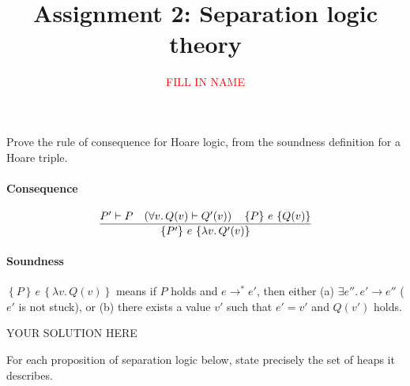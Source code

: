 \documentclass[11pt,twoside]{exam}
\title{Assignment 2: Separation logic theory}
\author{\textcolor{red}{FILL IN NAME}}
\def\fun#1{\lambda #1.\,}
\def\hoare#1#2#3{\left\{#1\right\} \, #2 \, \left\{#3\right\}}
\def\entails{\vdash}
\def\pointsto{\mapsto}
\begin{document}
\maketitle

\begin{questions}

\question[5]
Prove the rule of consequence for Hoare logic, from the soundness definition for
a Hoare triple.

\paragraph{Consequence}
\[
  \frac{P' \entails P \quad (\forall v.\, Q(v) \entails Q'(v)) \quad \hoare{P}{e}{Q(v)}}{%
  \hoare{P'}{e}{\fun{v} Q'(v)}
  }
\]

\paragraph{Soundness}
$\hoare{P}{e}{\fun{v} Q(v)}$ means if $P$ holds and $e \to^* e'$, then either
(a) $\exists e''.\, e' \to e''$ ($e'$ is not stuck), or (b) there exists a value
$v'$ such that $e' = v'$ and $Q(v')$ holds.

\begin{solution}
  YOUR SOLUTION HERE
\end{solution}

\question
For each proposition of separation logic below, state precisely the set of heaps
it describes.

\end{questions}
\end{document}

